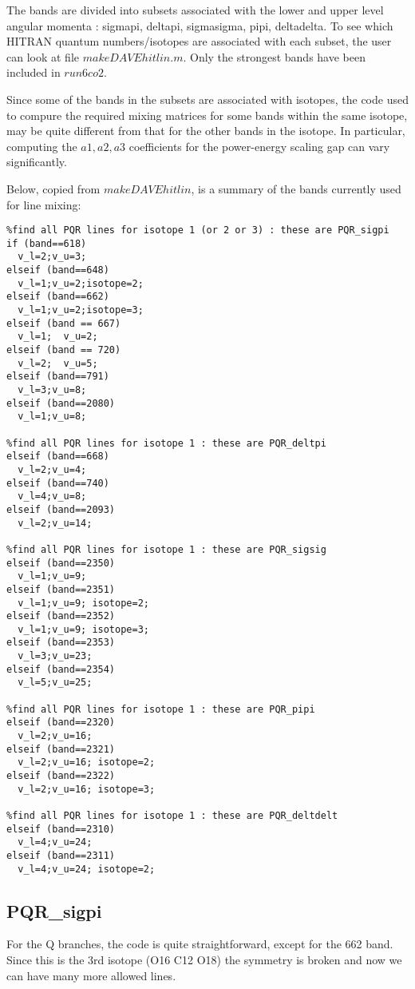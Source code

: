 \documentclass[11pt]{article}
\begin{document}
The bands are divided into subsets associated with the lower and upper level
angular momenta : sigmapi, deltapi, sigmasigma, pipi, deltadelta. To see 
which HITRAN quantum numbers/isotopes are associated with each subset, 
the user can look at file $makeDAVEhitlin.m$. Only the strongest bands have
been included in $run6co2$.

Since some of the bands in the subsets are associated with isotopes, the 
code used to compure the required mixing matrices for some bands within 
the same isotope, may be quite different from that for the other bands in 
the isotope. In particular, computing the $a1,a2,a3$  coefficients for the 
power-energy scaling gap can vary significantly.

Below, copied from $makeDAVEhitlin$, is a summary of the bands currently 
used for line mixing: 
\begin{verbatim}
%find all PQR lines for isotope 1 (or 2 or 3) : these are PQR_sigpi
if (band==618)
  v_l=2;v_u=3;
elseif (band==648)
  v_l=1;v_u=2;isotope=2;
elseif (band==662)
  v_l=1;v_u=2;isotope=3;
elseif (band == 667)
  v_l=1;  v_u=2; 
elseif (band == 720)
  v_l=2;  v_u=5; 
elseif (band==791)
  v_l=3;v_u=8;
elseif (band==2080)
  v_l=1;v_u=8;

%find all PQR lines for isotope 1 : these are PQR_deltpi
elseif (band==668)
  v_l=2;v_u=4;
elseif (band==740)
  v_l=4;v_u=8;
elseif (band==2093)
  v_l=2;v_u=14;

%find all PQR lines for isotope 1 : these are PQR_sigsig
elseif (band==2350)
  v_l=1;v_u=9;
elseif (band==2351)
  v_l=1;v_u=9; isotope=2;
elseif (band==2352)
  v_l=1;v_u=9; isotope=3;
elseif (band==2353)
  v_l=3;v_u=23; 
elseif (band==2354)
  v_l=5;v_u=25; 

%find all PQR lines for isotope 1 : these are PQR_pipi
elseif (band==2320) 
  v_l=2;v_u=16; 
elseif (band==2321) 
  v_l=2;v_u=16; isotope=2;
elseif (band==2322) 
  v_l=2;v_u=16; isotope=3;

%find all PQR lines for isotope 1 : these are PQR_deltdelt
elseif (band==2310) 
  v_l=4;v_u=24;
elseif (band==2311) 
  v_l=4;v_u=24; isotope=2;

\end{verbatim}

\subsection{PQR\_sigpi}
For the Q branches, the code is quite straightforward, except for the 662 
band. Since this is the 3rd isotope (O16 C12 O18) the symmetry is broken 
and now we can have many more allowed lines. 
\end{document}
